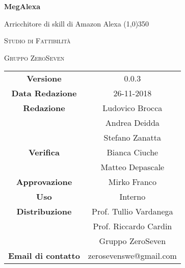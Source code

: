 \documentclass[a4paper,12pt]{book}
\author{Mirko Franco}
\date{26-11-2018}
\begin{document}
\begin{titlepage}
	\centering
	{\huge\bfseries MegAlexa\par}
	Arricchitore di skill di Amazon Alexa
	\line(1,0){350} \\
	{\scshape\LARGE Studio di Fattibilità \par}
	\vspace{1cm}
	{\scshape Gruppo ZeroSeven \par}
	\logo
	\begin{tabular}{c|c}
		{\hfill \textbf{Versione}} 			& 0.0.3				\\
		{\hfill\textbf{Data Redazione}} 	& 26-11-2018		\\ 
		{\hfill\textbf{Redazione}} 			&  		Ludovico Brocca \\ & Andrea Deidda\\ & Stefano Zanatta		\\
		{\hfill\textbf{Verifica}} 				&  					Bianca Ciuche \\ & Matteo Depascale\\ 
		{\hfill\textbf{Approvazione}} 		&  				Mirko Franco\\ 
		{\hfill\textbf{Uso}} 					& 		Interno		\\ 
		{\hfill\textbf{Distribuzione}} 			& 			Prof. Tullio Vardanega \\ & Prof. Riccardo Cardin \\ & Gruppo ZeroSeven		\\ 
		{\hfill\textbf{Email di contatto}} & zerosevenswe@gmail.com \\
	\end{tabular}
\end{titlepage}
	

	
\label{LastFrontPage}
	\newpage	
	
	\pagestyle{mymain}
	\tableofcontents
	
		
		
		
			
	\label{LastPage}
\end{document}

